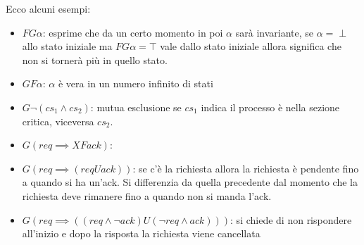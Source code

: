 \begin{esempio}
    Ecco alcuni esempi:
    \begin{itemize}
        \item $FG\alpha$: esprime che da un certo momento in poi $\alpha$ sarà
              invariante, se $\alpha = \perp$ allo stato iniziale ma $FG\alpha = \top$
              vale dallo stato iniziale allora significa che non si tornerà più
              in quello stato.
        \item $GF\alpha$: $\alpha$ è vera in un numero infinito di stati
        \item $G\lnot (cs_1\land cs_2)$: mutua esclusione se $cs_1$ indica il
              processo è nella sezione critica, viceversa $cs_2$.
        \item $G(req \implies XF ack)$:
        \item $G(req \implies (req U ack))$: se c'è la richiesta allora la richiesta
              è pendente fino a quando si ha un'ack. Si differenzia da quella
              precedente dal momento che la richiesta deve rimanere fino a quando
              non si manda l'ack.
        \item $G(req \implies ((req\land \lnot ack) U (\lnot req \land ack)))$:
              si chiede di non rispondere all'inizio e dopo la risposta la richiesta
              viene cancellata
    \end{itemize}
\end{esempio}

